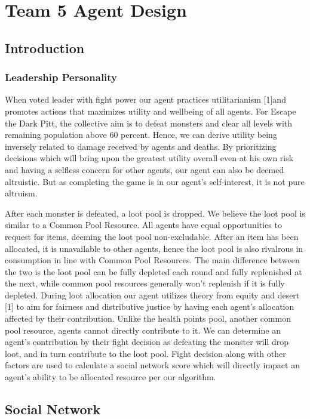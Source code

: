 \useunder{\uline}{\ul}{}
\chapter{Team 5 Agent Design}\label{team_5_agent_design}
\section{Introduction}
\subsection{Leadership Personality}
\noindent When voted leader with fight power our agent practices utilitarianism [1]and promotes actions that maximizes utility and wellbeing of all agents. For Escape the Dark Pitt, the collective aim is to defeat monsters and clear all levels with remaining population above 60 percent. Hence, we can derive utility being inversely related to damage received by agents and deaths. By prioritizing decisions which will bring upon the greatest utility overall even at his own risk and having a selfless concern for other agents, our agent can also be deemed altruistic. But as completing the game is in our agent’s self-interest, it is not pure altruism.
\medskip

\noindent After each monster is defeated, a loot pool is dropped. We believe the loot pool is similar to a Common Pool Resource. All agents have equal opportunities to request for items, deeming the loot pool non-excludable. After an item has been allocated, it is unavailable to other agents, hence the loot pool is also rivalrous in consumption in line with Common Pool Resources. The main difference between the two is the loot pool can be fully depleted each round and fully replenished at the next, while common pool resources generally won’t replenish if it is fully depleted. During loot allocation our agent utilizes theory from equity and desert [1] to aim for fairness and distributive justice by having each agent’s allocation affected by their contribution. Unlike the health points pool, another common pool resource, agents cannot directly contribute to it. We can determine an agent’s contribution by their fight decision as defeating the monster will drop loot, and in turn contribute to the loot pool. Fight decision along with other factors are used to calculate a social network score which will directly impact an agent’s ability to be allocated resource per our algorithm.


\section{Social Network}


